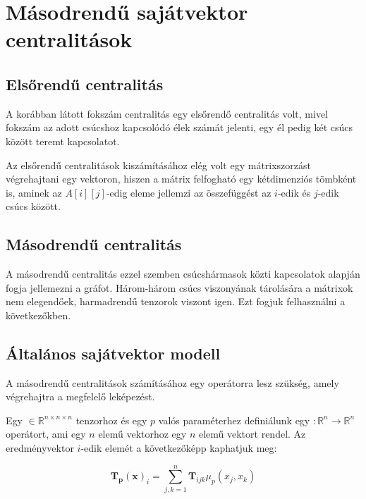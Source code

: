 \documentclass[12pt,numbers=noenddot]{report}
\begin{document}

\chapter{Másodrendű sajátvektor centralitások}


\section{Elsőrendű centralitás}

A korábban látott fokszám centralitás egy elsőrendő centralitás volt,
mivel fokszám az adott csúcshoz kapcsolódó élek számát jelenti,
egy él pedig két csúcs között teremt kapcsolatot. 

Az elsőrendű centralitások kiszámításához elég volt egy mátrixszorzást 
végrehajtani egy vektoron, hiszen a mátrix felfogható egy kétdimenziós tömbként
is, aminek az $A[i][j]$-edig eleme jellemzi az összefüggést az $i$-edik és 
$j$-edik csúcs között.


\section{Másodrendű centralitás}

A másodrendű centralitás ezzel szemben csúcshármasok közti kapcsolatok alapján 
fogja jellemezni a gráfot. Három-három csúcs viszonyának tárolására a mátrixok 
nem elegendőek, harmadrendű tenzorok viszont igen.
Ezt fogjuk felhasználni a következőkben.


\section{Általános sajátvektor modell}

A másodrendű centralitások számításához egy operátorra lesz szükség, 
amely végrehajtra a megfelelő leképezést.

Egy \unboldmath $\in \mathbb{R}^{n \times n \times n}$ 
tenzorhoz és egy $p$ valós paraméterhez definiálunk egy 
\unboldmath $: \mathbb{R}^n \rightarrow \mathbb{R}^n$ operátort,
ami egy $n$ elemű vektorhoz egy $n$ elemű vektort rendel. 
Az eredményvektor $i$-edik elemét a következőképp kaphatjuk meg:

$$\boldsymbol{T_p}(\boldsymbol{x})_i = \sum_{j,k=1}^n \boldsymbol{T}_{ijk} 
\mu_p(x_j,x_k)$$
\end{document}
